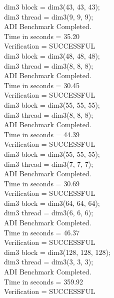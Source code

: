 \documentclass[a4paper,12pt,titlepage,draft]{article}
\begin{document}
\begin{minipage}{.45\textwidth}
    dim3 block = dim3(43, 43, 43);\\
    dim3 thread = dim3(9, 9, 9);\\
    ADI Benchmark Completed.\\
    Time in seconds =             35.20\\
    Verification    =         SUCCESSFUL\\
    
    dim3 block = dim3(48, 48, 48);\\
    dim3 thread = dim3(8, 8, 8);\\
    ADI Benchmark Completed.\\
    Time in seconds =             30.45\\
    Verification    =         SUCCESSFUL\\
    
    dim3 block = dim3(55, 55, 55);\\
    dim3 thread = dim3(8, 8, 8);\\
    ADI Benchmark Completed.\\
    Time in seconds =             44.39\\
    Verification    =         SUCCESSFUL\\
    
    dim3 block = dim3(55, 55, 55);\\
    dim3 thread = dim3(7, 7, 7);\\
    ADI Benchmark Completed.\\
    Time in seconds =             30.69\\
    Verification    =         SUCCESSFUL\\
    
    dim3 block = dim3(64, 64, 64);\\
    dim3 thread = dim3(6, 6, 6);\\
    ADI Benchmark Completed.\\
    Time in seconds =              46.37\\
    Verification    =         SUCCESSFUL\\
    
    dim3 block = dim3(128, 128, 128);\\
    dim3 thread = dim3(3, 3, 3);\\
    ADI Benchmark Completed.\\
    Time in seconds =             359.92\\
    Verification    =         SUCCESSFUL\\
\end{minipage}
\end{document}
